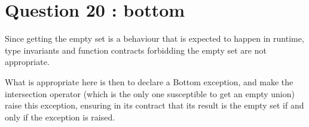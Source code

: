 \section{Question 20 : bottom}

Since getting the empty set is a behaviour that is expected to happen in runtime,
type invariants and function contracts forbidding the empty set are not appropriate.

What is appropriate here is then to declare a Bottom exception, and make the
intersection operator (which is the only one susceptible to get an empty union) raise
this exception, ensuring in its contract that its result is the empty set if and only
if the exception is raised.
